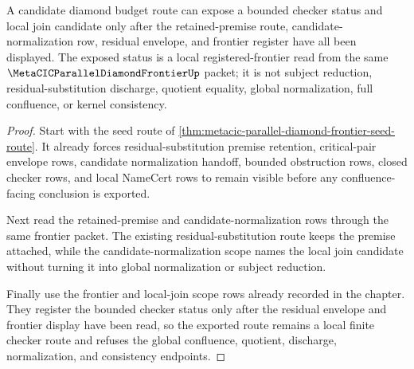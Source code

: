 \begin{theorem}
\label{thm:metacic-parallel-diamond-frontier-registered-frontier-route}
A candidate diamond budget route can expose a bounded checker status and local join candidate only after the retained-premise route, candidate-normalization row, residual envelope, and frontier register have all been displayed. The exposed status is a local registered-frontier read from the same $\MetaCICParallelDiamondFrontierUp$ packet; it is not subject reduction, residual-substitution discharge, quotient equality, global normalization, full confluence, or kernel consistency.
\end{theorem}
\begin{proof}
Start with the seed route of \autoref{thm:metacic-parallel-diamond-frontier-seed-route}. It already forces residual-substitution premise retention, critical-pair envelope rows, candidate normalization handoff, bounded obstruction rows, closed checker rows, and local NameCert rows to remain visible before any confluence-facing conclusion is exported.

Next read the retained-premise and candidate-normalization rows through the same frontier packet. The existing residual-substitution route keeps the premise attached, while the candidate-normalization scope names the local join candidate without turning it into global normalization or subject reduction.

Finally use the frontier and local-join scope rows already recorded in the chapter. They register the bounded checker status only after the residual envelope and frontier display have been read, so the exported route remains a local finite checker route and refuses the global confluence, quotient, discharge, normalization, and consistency endpoints.
\end{proof}

